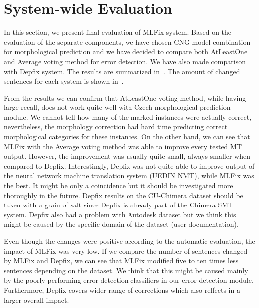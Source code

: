 \section{System-wide Evaluation}

In this section, we present final evaluation of MLFix system. Based on the evaluation of the
separate components, we have chosen CNG model combination for morphological prediction and we
have decided to compare both AtLeastOne and Average voting method for error detection. We
have also made comparison with Depfix system. The results are summarized in~.
The amount of changed sentences for each system is shown in~.

From the results we can confirm that AtLeastOne voting method, while having large recall, does not work
quite well with Czech morphological prediction module. We cannot tell how many of the marked instances were actually
correct, nevertheless, the morphology correction had hard time predicting correct morphological categories
for these instances. On the other hand, we can see that MLFix with the Average voting method
was able to improve every tested MT output. However, the improvement was
usually quite small, always smaller when compared to Depfix. Interestingly,
Depfix was not quite able to improve output of the neural network machine translation system (UEDIN NMT),
while MLFix was the best. It might be only a coincidence but it should be investigated more thoroughly
in the future. Depfix results on the CU-Chimera dataset should be taken with a grain of salt since
Depfix is already part of the Chimera SMT system. Depfix also had a problem with Autodesk dataset
but we think this might be caused by the specific domain of the dataset (user documentation).

Even though the changes were positive according to the automatic evaluation, the impact of MLFix was
very low. If we compare the number of sentences changed by MLFix and Depfix, we can see that MLFix
modified five to ten times less sentences depending on the dataset. We think that this might be
caused mainly by the poorly performing error detection classifiers in our error detection module.
Furthermore, Depfix covers wider range of corrections which also relfects in a larger overall impact.


